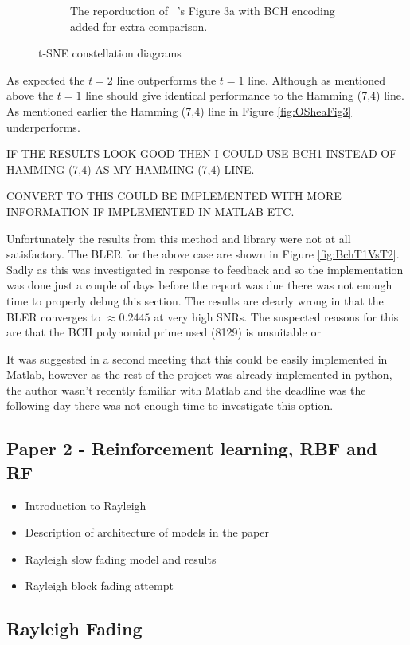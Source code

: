 \documentclass[12pt,onecolumn,letterpaper]{article}
\begin{document}
\begin{figure}[t!]
\begin{subfigure}[t]{0.45\textwidth}
       \caption{The reporduction of ~\cite{oShea}'s Figure 3a with BCH encoding added for extra comparison.}
       \label{fig:OSheaFigure3aBch}
   \end{subfigure}
   \caption{t-SNE constellation diagrams}
   \label{fig:BchFigures}
\end{figure}

As expected the $t=2$ line outperforms the $t=1$ line. Although as mentioned above the $t=1$ line should give identical performance to the Hamming (7,4) line. As mentioned earlier the Hamming (7,4) line in Figure \ref{fig:OSheaFig3} underperforms. 

IF THE RESULTS LOOK GOOD THEN I COULD USE BCH1 INSTEAD OF HAMMING (7,4) AS MY HAMMING (7,4) LINE.

CONVERT TO THIS COULD BE IMPLEMENTED WITH MORE INFORMATION IF IMPLEMENTED IN MATLAB ETC.

Unfortunately the results from this method and library were not at all satisfactory. The BLER for the above case are shown in Figure \ref{fig:BchT1VsT2}. Sadly as this was investigated in response to feedback and so the implementation was done just a couple of days before the report was due there was not enough time to properly debug this section. The results are clearly wrong in that the BLER converges to $\approx0.2445$ at very high SNRs. The suspected reasons for this are that the BCH polynomial prime used (8129) is unsuitable or  

It was suggested in a second meeting that this could be easily implemented in Matlab, however as the rest of the project was already implemented in python, the author wasn't recently familiar with Matlab and the deadline was the following day there was not enough time to investigate this option. 

\subsection{Paper 2 - Reinforcement learning, RBF and RF}

\begin{itemize}
   \item Introduction to Rayleigh
   \item Description of architecture of models in the paper
   \item Rayleigh slow fading model and results
   \item Rayleigh block fading attempt 
\end{itemize}

\subsection{Rayleigh Fading}
\end{document}
